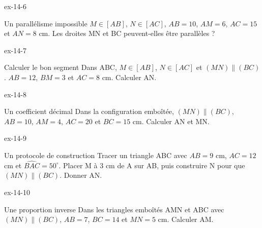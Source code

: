 \begin{blocLivre}{ex-14-6}\begin{exercice}[2]{Un parallélisme impossible}
$M\in[AB]$, $N\in[AC]$, $AB=10$, $AM=6$, $AC=15$ et $AN=8$ cm. Les droites MN et BC peuvent-elles être parallèles ?
\label{fig-ex-14-6}
\end{exercice}\end{blocLivre}
\begin{blocLivre}{ex-14-7}\begin{exercice}[2]{Calculer le bon segment}
Dans ABC, $M\in[AB]$, $N\in[AC]$ et $(MN)\parallel(BC)$. $AB=12$, $BM=3$ et $AC=8$ cm. Calculer AN.
\label{fig-ex-14-7}
\end{exercice}\end{blocLivre}
\begin{blocLivre}{ex-14-8}\begin{exercice}[2]{Un coefficient décimal}
Dans la configuration emboîtée, $(MN)\parallel(BC)$, $AB=10$, $AM=4$, $AC=20$ et $BC=15$ cm. Calculer AN et MN.
\label{fig-ex-14-8}
\end{exercice}\end{blocLivre}
\begin{blocLivre}{ex-14-9}\begin{exercice}[2]{Un protocole de construction}
Tracer un triangle ABC avec $AB=9$ cm, $AC=12$ cm et $\widehat{BAC}=50^\circ$. Placer M à 3 cm de A sur AB, puis construire N pour que $(MN)\parallel(BC)$. Donner AN.
\label{fig-ex-14-9}
\end{exercice}\end{blocLivre}
\begin{blocLivre}{ex-14-10}\begin{exercice}[2]{Une proportion inverse}
Dans les triangles emboîtés AMN et ABC avec $(MN)\parallel(BC)$, $AB=7$, $BC=14$ et $MN=5$ cm. Calculer AM.
\label{fig-ex-14-10}
\end{exercice}\end{blocLivre}

